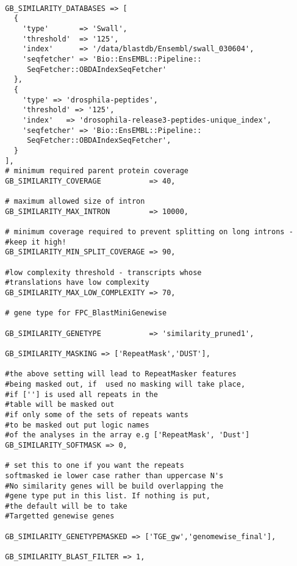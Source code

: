 \documentclass[a4paper,10pt]{article}
\begin{document}
\begin{verbatim}

  GB_SIMILARITY_DATABASES => [
    {                             
      'type'       => 'Swall',
      'threshold'  => '125',
      'index'      => '/data/blastdb/Ensembl/swall_030604',
      'seqfetcher' => 'Bio::EnsEMBL::Pipeline::
       SeqFetcher::OBDAIndexSeqFetcher'
    },
    {
      'type' => 'drosphila-peptides',
      'threshold' => '125',
      'index'   => 'drosophila-release3-peptides-unique_index',
      'seqfetcher' => 'Bio::EnsEMBL::Pipeline::
       SeqFetcher::OBDAIndexSeqFetcher',
    }
  ],
  # minimum required parent protein coverage
  GB_SIMILARITY_COVERAGE           => 40,
  
  # maximum allowed size of intron 
  GB_SIMILARITY_MAX_INTRON         => 10000,
  
  # minimum coverage required to prevent splitting on long introns - 
  #keep it high!
  GB_SIMILARITY_MIN_SPLIT_COVERAGE => 90,
  
  #low complexity threshold - transcripts whose 
  #translations have low complexity
  GB_SIMILARITY_MAX_LOW_COMPLEXITY => 70,
  
  # gene type for FPC_BlastMiniGenewise
  
  GB_SIMILARITY_GENETYPE           => 'similarity_pruned1',
  
  GB_SIMILARITY_MASKING => ['RepeatMask','DUST'],
  
  #the above setting will lead to RepeatMasker features 
  #being masked out, if  used no masking will take place,
  #if [''] is used all repeats in the 
  #table will be masked out
  #if only some of the sets of repeats wants 
  #to be masked out put logic names 
  #of the analyses in the array e.g ['RepeatMask', 'Dust']
  GB_SIMILARITY_SOFTMASK => 0, 
  
  # set this to one if you want the repeats 
  softmasked ie lower case rather than uppercase N's
  #No similarity genes will be build overlapping the 
  #gene type put in this list. If nothing is put, 
  #the default will be to take 
  #Targetted genewise genes
  
  GB_SIMILARITY_GENETYPEMASKED => ['TGE_gw','genomewise_final'],
  
  GB_SIMILARITY_BLAST_FILTER => 1,
  
\end{verbatim}
\end{document}
